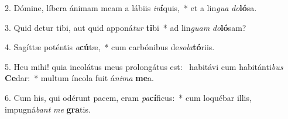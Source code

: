 2. Dómine, líbera ánimam meam a lábiis \textit{in}\textbf{í}quis,~*  et a lin\textit{gua} \textit{do}\textbf{ló}sa.\

3. Quid detur tibi, aut quid apponá\textit{tur} \textbf{ti}bi~*  ad lin\textit{guam} \textit{do}\textbf{ló}sam?\

4. Sagíttæ poténtis \textit{a}\textbf{cú}tæ,~*  cum carbónibus de\textit{so}\textit{la}\textbf{tó}riis.\

5. Heu mihi! quia incolátus meus prolongátus est: \dag\  habitávi cum habitánti\textit{bus} \textbf{Ce}dar:~*  multum íncola fuit á\textit{ni}\textit{ma} \textbf{me}a.\

6. Cum his, qui odérunt pacem, eram \textit{pa}\textbf{cí}ficus:~*  cum loquébar illis, impugná\textit{bant} \textit{me} \textbf{gra}tis.\

